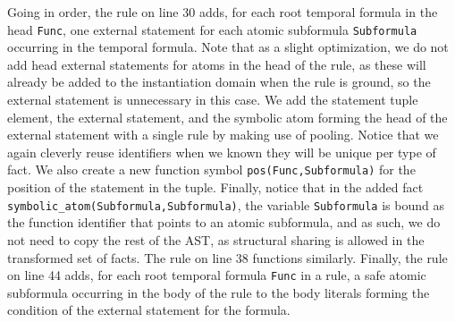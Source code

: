 Going in order, the rule on line 30 adds, for each root temporal
formula in the head \verb|Func|, one external statement for each
atomic subformula \verb|Subformula| occurring in the temporal
formula. Note that as a slight optimization, we do not add head
external statements for atoms in the head of the rule, as these will
already be added to the instantiation domain when the rule is ground,
so the external statement is unnecessary in this case. We add the
statement tuple element, the external statement, and the symbolic atom
forming the head of the external statement with a single rule by
making use of pooling. Notice that we again cleverly reuse identifiers
when we known they will be unique per type of fact. We also create a
new function symbol \verb|pos(Func,Subformula)| for the position of
the statement in the tuple. Finally, notice that in the added fact
\verb|symbolic_atom(Subformula,Subformula)|, the variable
\verb|Subformula| is bound as the function identifier that points to
an atomic subformula, and as such, we do not need to copy the rest of
the AST, as structural sharing is allowed in the transformed set of
facts. The rule on line 38 functions similarly.  Finally, the rule on
line 44 adds, for each root temporal formula \verb|Func| in a rule, a
safe atomic subformula occurring in the body of the rule to the body
literals forming the condition of the external statement for the
formula.

